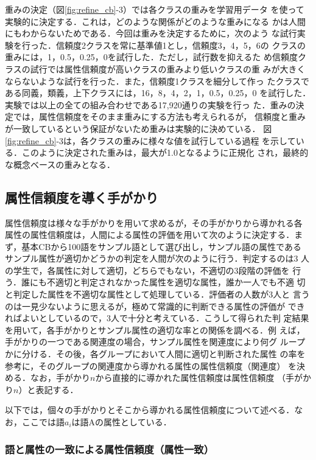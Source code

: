 重みの決定（図\ref{fig:refine_cb}-3）では各クラスの重みを学習用データ
を使って実験的に決定する．これは，どのような関係がどのような重みになる
かは人間にもわからないためである．今回は重みを決定するために，次のよう
な試行実験を行った．信頼度2クラスを常に基準値1とし，信頼度3，4，5，6の
クラスの重みには，1，0.5，0.25，0を試行した．ただし，試行数を抑えるた
め信頼度クラスの試行では属性信頼度が高いクラスの重みより低いクラスの重
みが大きくならないような試行を行った．また，信頼度1クラスを細分して作っ
たクラスである同義，類義，上下クラスには，16，8，4，2，1，0.5，0.25，0
を試行した．実験では以上の全ての組み合わせである17,920通りの実験を行っ
た．重みの決定では，属性信頼度をそのまま重みにする方法も考えられるが，
信頼度と重みが一致しているという保証がないため重みは実験的に決めている．
図\ref{fig:refine_cb}-3は，各クラスの重みに様々な値を試行している過程
を示している．このように決定された重みは，最大が1.0となるように正規化
され，最終的な概念ベースの重みとなる．

\subsection{属性信頼度を導く手がかり}

属性信頼度は様々な手がかりを用いて求めるが，その手がかりから導かれる各
属性の属性信頼度は，人間による属性の評価を用いて次のように決定する．ま
ず，基本CBから100語をサンプル語として選び出し，サンプル語の属性である
サンプル属性が適切かどうかの判定を人間が次のように行う．判定するのは3
人の学生で，各属性に対して適切，どちらでもない，不適切の3段階の評価を
行う．誰にも不適切と判定されなかった属性を適切な属性，誰か一人でも不適
切と判定した属性を不適切な属性として処理している．評価者の人数が3人と
言うのは一見少ないように思えるが，極めて常識的に判断できる属性の評価が
できればよいとしているので，3人で十分と考えている．こうして得られた判
定結果を用いて，各手がかりとサンプル属性の適切な率との関係を調べる．例
えば，手がかりの一つである関連度の場合，サンプル属性を関連度により何グ
ループかに分ける．その後，各グループにおいて人間に適切と判断された属性
の率を参考に，そのグループの関連度から導かれる属性の属性信頼度（関連度）
を決める．なお，手がかり$n$から直接的に導かれた属性信頼度は属性信頼度
（手がかり$n$）と表記する．

以下では，個々の手がかりとそこから導かれる属性信頼度について述べる．な
お，ここでは語$a_i$は語Aの属性としている．

\subsubsection{語と属性の一致による属性信頼度（属性一致）}

